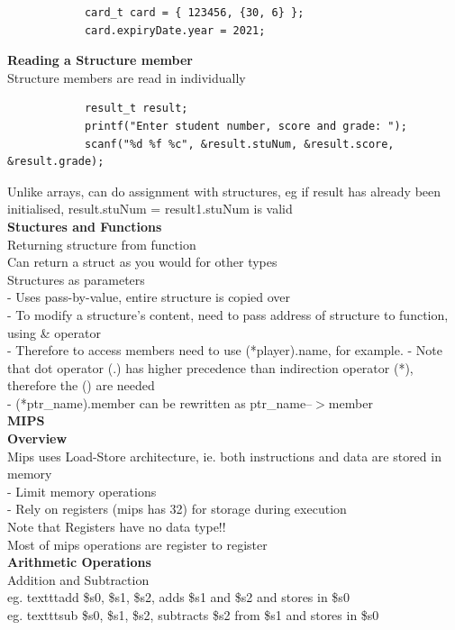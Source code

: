 \documentclass[10pt, a4paper]{article}
\begin{document}
\begin{multicols*}{3}
\begin{verbatim}
			card_t card = { 123456, {30, 6} };
			card.expiryDate.year = 2021;
		\end{verbatim}
		
		\textbf{Reading a Structure member}\\
		Structure members are read in individually
		\begin{verbatim}
			result_t result;
			printf("Enter student number, score and grade: ");
			scanf("%d %f %c", &result.stuNum, &result.score, &result.grade);
		\end{verbatim}
		Unlike arrays, can do assignment with structures, eg if result has already been initialised, result.stuNum = result1.stuNum is valid\\
		
		\textbf{Stuctures and Functions}\\
		
		Returning structure from function\\
		Can return a struct as you would for other types\\
		
		Structures as parameters\\
		- Uses pass-by-value, entire structure is copied over\\
		- To modify a structure's content, need to pass address of structure to function, using \& operator\\
		- Therefore to access members need to use (*player).name, for example. 
		- Note that dot operator (.) has higher precedence than indirection operator (*), therefore the () are needed\\
		- (*ptr\_name).member can be rewritten as ptr\_name--$>$member\\
		
		{\normalsize\textbf{MIPS}}\\
		\textbf{Overview}\\
		Mips uses Load-Store architecture, ie. both instructions and data are stored in memory\\
		- Limit memory operations\\
		- Rely on registers (mips has 32) for storage during execution\\
		Note that Registers have no data type!!\\
		Most of mips operations are register to register\\
		
		\textbf{Arithmetic Operations}\\
		Addition and Subtraction\\
		eg. texttt{add \$s0, \$s1, \$s2}, adds \$s1 and \$s2 and stores in \$s0\\
		eg. texttt{sub \$s0, \$s1, \$s2}, subtracts \$s2 from \$s1 and stores in \$s0\\		
		

\end{multicols*}
\end{document}
